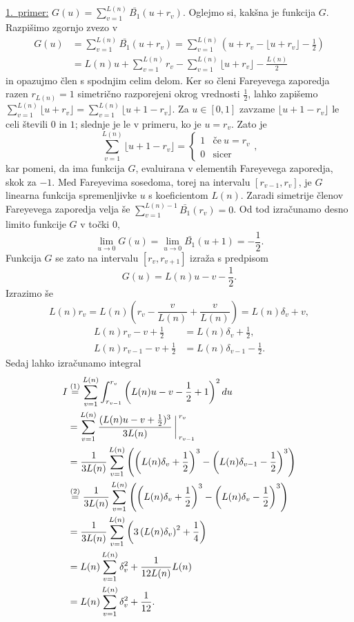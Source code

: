 \documentclass[mat1]{fmfdelo}
\begin{document}
\underline{1.~primer:} $G(u) = \sum_{v=1}^{L(n)} \bar{B_{1}}(u+r_v)$.
Oglejmo si, kakšna je funkcija $G$. Razpišimo zgornjo zvezo v
\begin{align}
G(u) &= \sum_{v=1}^{L(n)} \bar{B_{1}}(u+r_v) = \sum_{v=1}^{L(n)} \left(u+r_v - \lfloor u+r_v \rfloor - \frac{1}{2} \right) \nonumber \\
       &= L(n)u + \sum_{v=1}^{L(n)}r_v - \sum_{v=1}^{L(n)} \lfloor u+r_v \rfloor - \frac{L(n)}{2}
\end{align}
in opazujmo člen s spodnjim celim delom. Ker so členi Fareyevega zaporedja razen $r_{L(n)}=1$ simetrično razporejeni okrog vrednosti $\frac{1}{2}$, lahko zapišemo $\sum_{v=1}^{L(n)} \lfloor u+r_v \rfloor = \sum_{v=1}^{L(n)} \lfloor u+1-r_v \rfloor$. Za $u\in[0,1]$ zavzame $\lfloor u+1-r_v \rfloor$ le celi števili $0$ in $1$; slednje je le v primeru, ko je $u=r_{v}$. Zato je 
\[
\sum_{v=1}^{L(n)} \lfloor u+1-r_v \rfloor = \left\{
\begin{array}{rl}
	1 & \textrm{če}\ u = r_{v}\\
	0 & \textrm{sicer}
\end{array},
\right.
\]
kar pomeni, da ima funkcija $G$, evaluirana v elementih Fareyevega zaporedja, skok za $-1$. Med Fareyevima sosedoma, torej na intervalu $[r_{v-1},r_{v}]$, je $G$ linearna funkcija spremenljivke $u$ s koeficientom $L(n)$.
Zaradi simetrije členov Fareyevega zaporedja velja še $\sum_{v=1}^{L(n)-1} \bar{B_{1}}(r_v) = 0$. Od tod izračunamo desno limito funkcije $G$ v točki $0$,
\[ \lim_{u \to 0} G(u) = \lim_{u \to 0} \bar{B_{1}}(u+1) = -\frac{1}{2}. \]
Funkcija $G$ se zato na intervalu $[r_{v},r_{v+1}]$ izraža s predpisom
\[ G(u) = L(n)u - v - \frac{1}{2}. \]
%
Izrazimo še 
\[ L(n)r_{v} = L(n) \left( r_{v}-\frac{v}{L(n)}+\frac{v}{L(n)} \right) = L(n) \delta_{v} + v, \]
\begin{align*}
L(n)r_{v}-v+\frac{1}{2} &= L(n) \delta_{v} + \frac{1}{2}, \\
L(n)r_{v-1}-v+\frac{1}{2} &= L(n) \delta_{v-1} - \frac{1}{2}.
\end{align*}
%
Sedaj lahko izračunamo integral 
\begin{align}
\label{Eq:I1}
I &\stackrel{(1)}{=} \sum_{v=1}^{L(n)} \int_{r_{v-1}}^{r_{v}} \left( L(n)u-v-\frac{1}{2}+1 \right)^2 du \nonumber \\
  &= \sum_{v=1}^{L(n)} \frac{(L(n)u-v+\frac{1}{2})^3}{3L(n)} \bigg \arrowvert_{r_{v-1}}^{r_{v}} \nonumber \\
  &= \frac{1}{3L(n)} \sum_{v=1}^{L(n)} \left( \left(L(n) \delta_{v} + \frac{1}{2} \right)^3 - \left(L(n) \delta_{v-1} - \frac{1}{2} \right)^3 \right) \nonumber \\
  &\stackrel{(2)}{=} \frac{1}{3L(n)} \sum_{v=1}^{L(n)} \left( \left(L(n) \delta_{v} + \frac{1}{2} \right)^3 - \left(L(n) \delta_{v} - \frac{1}{2} \right)^3 \right) \nonumber \\
  &= \frac{1}{3L(n)} \sum_{v=1}^{L(n)} \left(3 \left(L(n) \delta_{v} \right)^2 + \frac{1}{4} \right) \nonumber \\
  &= L(n) \sum_{v=1}^{L(n)} \delta_{v}^2 + \frac{1}{12L(n)} L(n) \nonumber \\
  &= L(n) \sum_{v=1}^{L(n)} \delta_{v}^2 + \frac{1}{12}.
\end{align}
\end{document}
